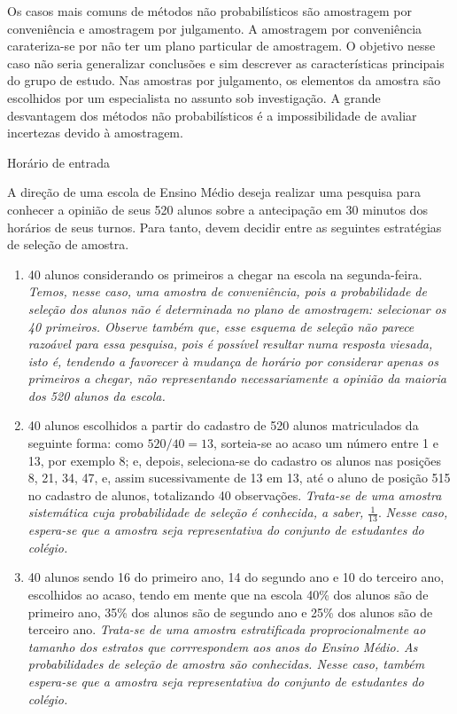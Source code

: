 Os casos mais comuns de métodos não probabilísticos são amostragem por conveniência e amostragem por julgamento. A amostragem por conveniência carateriza-se por não ter um plano particular de amostragem. O objetivo nesse caso não seria generalizar conclusões e sim descrever as características principais do grupo de estudo.  Nas amostras por julgamento, os elementos da amostra são escolhidos por um especialista no assunto sob investigação. A grande desvantagem dos métodos não probabilísticos é a impossibilidade de avaliar incertezas devido à amostragem.

\begin{example}{Horário de entrada}

A direção de uma escola de Ensino Médio deseja realizar uma pesquisa para conhecer a opinião de seus 520 alunos sobre a antecipação em 30 minutos dos horários de seus turnos. Para tanto, devem decidir entre as seguintes estratégias de seleção de amostra.
\begin{enumerate}
\item {} 
40 alunos considerando os primeiros a chegar na  escola na segunda-feira.  \emph{Temos, nesse caso, uma amostra de conveniência, pois a probabilidade de seleção dos alunos não é determinada no plano de amostragem: selecionar os 40 primeiros. Observe também que, esse esquema de seleção não parece razoável para essa pesquisa, pois é possível resultar numa resposta viesada, isto é, tendendo a favorecer à mudança de horário por considerar apenas os primeiros a chegar, não representando necessariamente a opinião da maioria dos 520 alunos da escola.}

\item {} 
40 alunos escolhidos a partir do cadastro de 520 alunos matriculados da seguinte forma: como \(520/40=13\), sorteia-se ao acaso um número entre 1 e 13, por exemplo 8; e, depois, seleciona-se do cadastro os alunos nas posições 8, 21, 34, 47,  e, assim sucessivamente de 13 em 13, até o aluno de posição 515 no cadastro de alunos, totalizando 40 observações. \emph{Trata-se de uma amostra sistemática cuja probabilidade de seleção é conhecida, a saber,} \(\frac{1}{13}\). \emph{Nesse caso, espera-se que a amostra seja representativa do conjunto de estudantes do colégio.}

\item {} 
40 alunos sendo 16 do primeiro ano, 14 do segundo ano e 10 do terceiro ano, escolhidos ao acaso, tendo em mente que na escola 40\% dos alunos são de primeiro ano, 35\% dos alunos são de segundo ano e 25\% dos alunos são de terceiro ano. \emph{Trata-se de uma amostra estratificada proprocionalmente ao tamanho dos estratos que corrrespondem aos anos do Ensino Médio. As probabilidades de seleção de amostra são conhecidas.  Nesse caso, também espera-se que a amostra seja representativa do conjunto de estudantes do colégio.}


\end{enumerate}
\end{example}

